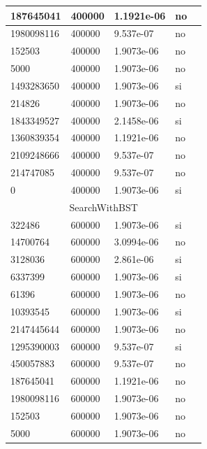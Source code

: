 \documentclass[12pt, fleqn]{article}                             %
\theoremstyle{break}                                            %
\begin{document}
\begin{longtable}{|m{5em}|m{5em}|m{10em}|m{5em}|@{}m{0pt}@{}}
            187645041& 400000  & 1.1921e-06 & no &\\[1em]    \hline
            1980098116& 400000  & 9.537e-07 & no &\\[1em]    \hline
            152503& 400000  & 1.9073e-06 & no &\\[1em]    \hline
            5000& 400000  & 1.9073e-06 & no &\\[1em]    \hline
            1493283650& 400000  & 1.9073e-06 & si &\\[1em]    \hline
            214826& 400000  & 1.9073e-06 & no &\\[1em]    \hline
            1843349527& 400000  & 2.1458e-06 & si &\\[1em]    \hline
            1360839354& 400000  & 1.1921e-06 & no &\\[1em]    \hline
            2109248666& 400000  & 9.537e-07 & no &\\[1em]    \hline
            214747085& 400000  & 9.537e-07 & no &\\[1em]    \hline
            0& 400000  & 1.9073e-06 & si &\\[1em]    \hline
            \multicolumn{5}{|c|}{SearchWithBST}   \\          \hline
            322486& 600000  & 1.9073e-06 & si &\\[1em]    \hline
            14700764& 600000  & 3.0994e-06 & no &\\[1em]    \hline
            3128036& 600000  & 2.861e-06 & si &\\[1em]    \hline
            6337399& 600000  & 1.9073e-06 & si &\\[1em]    \hline
            61396& 600000  & 1.9073e-06 & no &\\[1em]    \hline
            10393545& 600000  & 1.9073e-06 & si &\\[1em]    \hline
            2147445644& 600000  & 1.9073e-06 & no &\\[1em]    \hline
            1295390003& 600000  & 9.537e-07 & si &\\[1em]    \hline
            450057883& 600000  & 9.537e-07 & no &\\[1em]    \hline
            187645041& 600000  & 1.1921e-06 & no &\\[1em]    \hline
            1980098116& 600000  & 1.9073e-06 & no &\\[1em]    \hline
            152503& 600000  & 1.9073e-06 & no &\\[1em]    \hline
            5000& 600000  & 1.9073e-06 & no &\\[1em]    \hline

\end{longtable}
\end{document}
